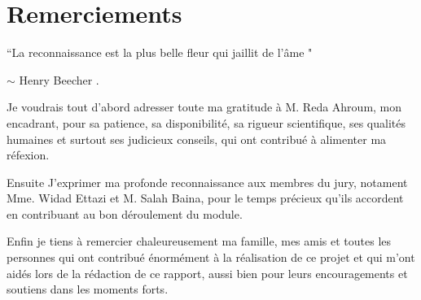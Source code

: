 
\chapter*{Remerciements}



\begin{center}
``La reconnaissance est la plus belle fleur qui jaillit de l'âme "
\end{center}
\begin{center} $\sim$ Henry Beecher . \end{center}
Je voudrais tout d'abord adresser toute ma gratitude à 
M. Reda Ahroum, mon encadrant, pour sa patience, sa disponibilité, sa rigueur scientifique, ses qualités humaines
et surtout ses judicieux conseils, qui ont contribué à alimenter ma réfexion.

Ensuite J'exprimer ma profonde reconnaissance aux membres du jury, notament Mme. Widad Ettazi et M. Salah Baina, pour le temps précieux qu'ils accordent en contribuant au bon déroulement du module.

Enfin je tiens à remercier chaleureusement ma famille, mes amis et toutes les personnes qui ont contribué énormément à la réalisation de ce projet et qui m'ont aidés lors de la rédaction de ce rapport, aussi bien pour leurs encouragements et soutiens dans les moments forts.

